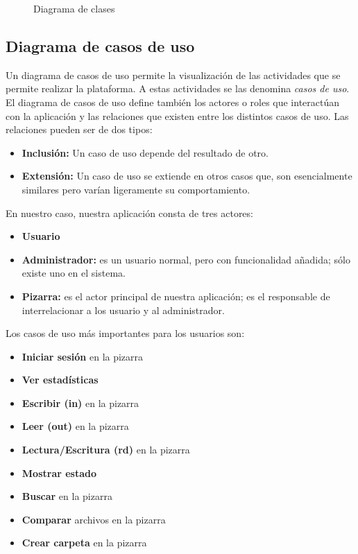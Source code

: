 {\color{red}{\huge PROVISIONAL}}

\begin{landscape}
\begin{figure}[!h]
\centering
\clases
\caption{Diagrama de clases}
\end{figure}
\end{landscape}

\subsection{Diagrama de casos de uso}
Un diagrama de casos de uso permite la visualización de las actividades que se permite realizar la plataforma. A estas actividades se las denomina \textit{casos de uso}. El diagrama de casos de uso define también los actores o roles que interactúan con la aplicación y las relaciones que existen entre los distintos casos de uso. Las relaciones pueden ser de dos tipos:

\begin{itemize}
	\item \textbf{Inclusión:} Un caso de uso depende del resultado de otro.
	\item \textbf{Extensión:} Un caso de uso se extiende en otros casos que, son esencialmente similares pero varían ligeramente su comportamiento.
\end{itemize}

En nuestro caso, nuestra aplicación consta de tres actores:
\begin{itemize}
\item \textbf{Usuario}
\item \textbf{Administrador:} es un usuario normal, pero con funcionalidad añadida; sólo existe uno en el sistema.
\item \textbf{Pizarra:} es el actor principal de nuestra aplicación; es el responsable de interrelacionar a los usuario y al administrador.   
\end{itemize}

Los casos de uso más importantes para los usuarios son:
\begin{itemize}
\item \textbf{Iniciar sesión} en la pizarra
\item \textbf{Ver estadísticas} 
\item \textbf{Escribir (in)} en la pizarra
\item \textbf{Leer (out)} en la pizarra
\item \textbf{Lectura/Escritura (rd)} en la pizarra
\item \textbf{Mostrar estado}
\item \textbf{Buscar} en la pizarra
\item \textbf{Comparar} archivos en la pizarra
\item \textbf{Crear carpeta} en la pizarra
\end{itemize}

